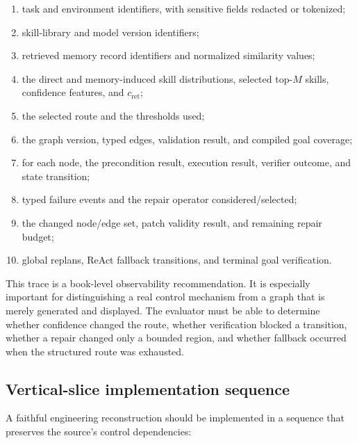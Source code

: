 \begin{enumerate}
  \item task and environment identifiers, with sensitive fields redacted or tokenized;
  \item skill-library and model version identifiers;
  \item retrieved memory record identifiers and normalized similarity values;
  \item the direct and memory-induced skill distributions, selected top-\(M\) skills, confidence features, and \(c_{\mathrm{ret}}\);
  \item the selected route and the thresholds used;
  \item the graph version, typed edges, validation result, and compiled goal coverage;
  \item for each node, the precondition result, execution result, verifier outcome, and state transition;
  \item typed failure events and the repair operator considered/selected;
  \item the changed node/edge set, patch validity result, and remaining repair budget;
  \item global replans, ReAct fallback transitions, and terminal goal verification.
\end{enumerate}

This trace is a book-level observability recommendation. It is especially important for distinguishing a real control mechanism from a graph that is merely generated and displayed. The evaluator must be able to determine whether confidence changed the route, whether verification blocked a transition, whether a repair changed only a bounded region, and whether fallback occurred when the structured route was exhausted.

\subsection{Vertical-slice implementation sequence}

A faithful engineering reconstruction should be implemented in a sequence that preserves the source's control dependencies:

